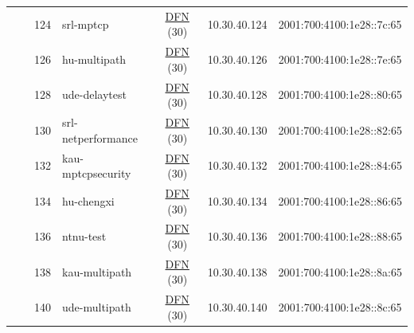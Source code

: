\begin{small}
\begin{center}
\begin{longtable}{|c|c|c|c|c|c|c|c|}
  &  & \tiny{124} & \multicolumn{1}{|l|}{\tiny{srl-mptcp}} & \multicolumn{2}{|c|}{\tiny{\href{https://www.dfn.de}{DFN} (30)}} & \tiny{10.30.40.124} & \tiny{2001:700:4100:1e28::7c:65} \\* \cline{3-3}\cline{4-4}\cline{5-5}\cline{6-6}\cline{7-7}\cline{8-8}
  &  & \tiny{126} & \multicolumn{1}{|l|}{\tiny{hu-multipath}} & \multicolumn{2}{|c|}{\tiny{\href{https://www.dfn.de}{DFN} (30)}} & \tiny{10.30.40.126} & \tiny{2001:700:4100:1e28::7e:65} \\* \cline{3-3}\cline{4-4}\cline{5-5}\cline{6-6}\cline{7-7}\cline{8-8}
  &  & \tiny{128} & \multicolumn{1}{|l|}{\tiny{ude-delaytest}} & \multicolumn{2}{|c|}{\tiny{\href{https://www.dfn.de}{DFN} (30)}} & \tiny{10.30.40.128} & \tiny{2001:700:4100:1e28::80:65} \\* \cline{3-3}\cline{4-4}\cline{5-5}\cline{6-6}\cline{7-7}\cline{8-8}
  &  & \tiny{130} & \multicolumn{1}{|l|}{\tiny{srl-netperformance}} & \multicolumn{2}{|c|}{\tiny{\href{https://www.dfn.de}{DFN} (30)}} & \tiny{10.30.40.130} & \tiny{2001:700:4100:1e28::82:65} \\* \cline{3-3}\cline{4-4}\cline{5-5}\cline{6-6}\cline{7-7}\cline{8-8}
  &  & \tiny{132} & \multicolumn{1}{|l|}{\tiny{kau-mptcpsecurity}} & \multicolumn{2}{|c|}{\tiny{\href{https://www.dfn.de}{DFN} (30)}} & \tiny{10.30.40.132} & \tiny{2001:700:4100:1e28::84:65} \\* \cline{3-3}\cline{4-4}\cline{5-5}\cline{6-6}\cline{7-7}\cline{8-8}
  &  & \tiny{134} & \multicolumn{1}{|l|}{\tiny{hu-chengxi}} & \multicolumn{2}{|c|}{\tiny{\href{https://www.dfn.de}{DFN} (30)}} & \tiny{10.30.40.134} & \tiny{2001:700:4100:1e28::86:65} \\* \cline{3-3}\cline{4-4}\cline{5-5}\cline{6-6}\cline{7-7}\cline{8-8}
  &  & \tiny{136} & \multicolumn{1}{|l|}{\tiny{ntnu-test}} & \multicolumn{2}{|c|}{\tiny{\href{https://www.dfn.de}{DFN} (30)}} & \tiny{10.30.40.136} & \tiny{2001:700:4100:1e28::88:65} \\* \cline{3-3}\cline{4-4}\cline{5-5}\cline{6-6}\cline{7-7}\cline{8-8}
  &  & \tiny{138} & \multicolumn{1}{|l|}{\tiny{kau-multipath}} & \multicolumn{2}{|c|}{\tiny{\href{https://www.dfn.de}{DFN} (30)}} & \tiny{10.30.40.138} & \tiny{2001:700:4100:1e28::8a:65} \\* \cline{3-3}\cline{4-4}\cline{5-5}\cline{6-6}\cline{7-7}\cline{8-8}
  &  & \tiny{140} & \multicolumn{1}{|l|}{\tiny{ude-multipath}} & \multicolumn{2}{|c|}{\tiny{\href{https://www.dfn.de}{DFN} (30)}} & \tiny{10.30.40.140} & \tiny{2001:700:4100:1e28::8c:65} \\* \cline{3-3}\cline{4-4}\cline{5-5}\cline{6-6}\cline{7-7}\cline{8-8}

\end{longtable}
\end{center}
\end{small}
